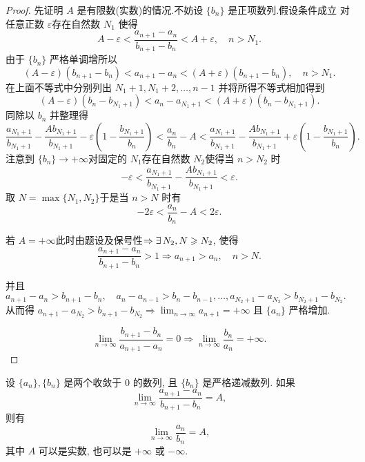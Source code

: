 \begin{proof}
    先证明 $A$ 是有限数(实数)的情况.不妨设 $\{b_n\}$ 是正项数列.假设条件成立
    对任意正数 $\varepsilon$存在自然数 $N_1$ 使得
    $$
        A - \varepsilon < \frac{a_{n+1} - a_n}{b_{n+1} - b_n} < A + \varepsilon, \quad n > N_1.
    $$
    由于 $\{b_n\}$ 严格单调增所以
    $$
        (A - \varepsilon)(b_{n+1} - b_n) < a_{n+1} - a_n < (A + \varepsilon)(b_{n+1} - b_n), \quad n > N_1.
    $$
    在上面不等式中分别列出 $N_1 + 1, N_1 + 2, \dots, n - 1$ 并将所得不等式相加得到
    $$
        (A - \varepsilon)(b_n - b_{N_1 + 1}) < a_n - a_{N_1 + 1} < (A + \varepsilon)(b_n - b_{N_1 + 1}).
    $$
    同除以 $b_n$ 并整理得
    $$
        \frac{a_{N_1 + 1}}{b_{N_1 + 1}} - \frac{A b_{N_1 + 1}}{b_{N_1 + 1}} - \varepsilon \left( 1 - \frac{b_{N_1 + 1}}{b_n} \right) < \frac{a_n}{b_n} - A < \frac{a_{N_1 + 1}}{b_{N_1 + 1}} - \frac{A b_{N_1 + 1}}{b_{N_1 + 1}} + \varepsilon \left( 1 - \frac{b_{N_1 + 1}}{b_n} \right).
    $$
    注意到 $\{b_n\} \to +\infty$对固定的 $N_1$存在自然数 $N_2$使得当 $n > N_2$ 时
    $$
        -\varepsilon < \frac{a_{N_1 + 1}}{b_{N_1 + 1}} - \frac{A b_{N_1 + 1}}{b_{N_1 + 1}} < \varepsilon.
    $$
    取 $N = \max\{N_1, N_2\}$于是当 $n > N$ 时有
    $$
        -2\varepsilon < \frac{a_n}{b_n} - A < 2\varepsilon.
    $$

    若 $A = +\infty$此时由题设及保号性$\Rightarrow \exists N_2, N \ges N_2$, 使得
    $$
        \frac{a_{n+1} - a_n}{b_{n+1} - b_n} > 1 \Rightarrow a_{n+1} > a_n, \quad n > N.
    $$

    并且
    $
        a_{n+1} - a_n > b_{n+1} - b_n, \quad a_n - a_{n-1} > b_n - b_{n-1}, \dots, a_{N_2+1} - a_{N_2} > b_{N_2+1} - b_{N_2}.
    $
    从而得
    $
        a_{n+1} - a_{N_2} > b_{n+1} - b_{N_2} \Rightarrow \lim_{n \to \infty} a_{n+1} = +\infty$ 且  $\{a_n\}$ {严格增加}.

    $$
        \lim_{n \to \infty} \frac{b_{n+1} - b_n}{a_{n+1} - a_n} = 0 \Rightarrow \lim_{n \to \infty} \frac{b_n}{a_n} = +\infty.
    $$

\end{proof}

\begin{theorem} \label{thm:Stolz_zero}
    设 $\{a_n\}, \{b_n\}$ 是两个收敛于 $0$ 的数列, 且 $\{b_n\}$ 是严格递减数列. 如果
    $$ \lim_{n\to\infty} \frac{a_{n+1} - a_n}{b_{n+1} - b_n} = A, $$
    则有
    $$ \lim_{n\to\infty} \frac{a_n}{b_n} = A, $$
    其中 $A$ 可以是实数, 也可以是 $+\infty$ 或 $-\infty$.
\end{theorem}

